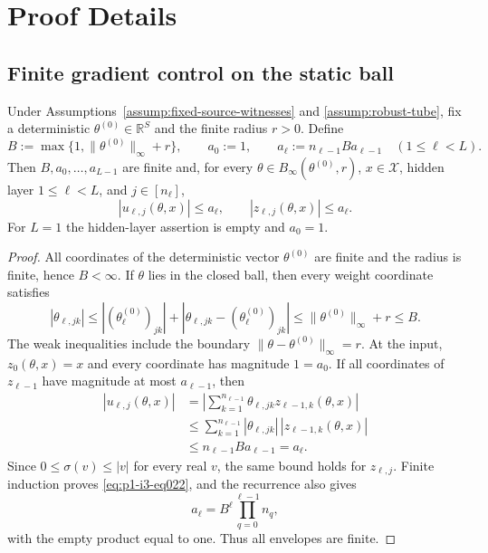 \appendix

\section{Proof Details}
\label{sec:proof-details}

\subsection{Finite gradient control on the static ball}
\label{app:step001-gradient}

\begin{lemma}
\label{lem:p1-i3-step001-forward}
Under Assumptions~\ref{assump:fixed-source-witnesses} and
\ref{assump:robust-tube}, fix a deterministic
$\theta^{(0)}\in\mathbb R^S$ and the finite radius $r>0$.  Define
\[
B:=\max\{1,\|\theta^{(0)}\|_\infty+r\},
\qquad a_0:=1,
\qquad a_\ell:=n_{\ell-1}B a_{\ell-1}
\quad(1\leq\ell<L).
\tag{21}\label{eq:p1-i3-eq021}
\]
Then $B,a_0,\ldots,a_{L-1}$ are finite and, for every
$\theta\in B_\infty(\theta^{(0)},r)$, $x\in\mathcal X$, hidden layer
$1\leq\ell<L$, and $j\in[n_\ell]$,
\[
|u_{\ell,j}(\theta,x)|\leq a_\ell,
\qquad
|z_{\ell,j}(\theta,x)|\leq a_\ell.
\tag{22}\label{eq:p1-i3-eq022}
\]
For $L=1$ the hidden-layer assertion is empty and $a_0=1$.
\end{lemma}

\begin{proof}
All coordinates of the deterministic vector $\theta^{(0)}$ are finite and
the radius is finite, hence $B<\infty$.  If $\theta$ lies in the closed ball,
then every weight coordinate satisfies
\[
|\theta_{\ell,jk}|
\leq |(\theta^{(0)}_\ell)_{jk}|
      +|\theta_{\ell,jk}-(\theta^{(0)}_\ell)_{jk}|
\leq \|\theta^{(0)}\|_\infty+r\leq B.
\tag{23}\label{eq:p1-i3-eq023}
\]
The weak inequalities include the boundary $\|\theta-\theta^{(0)}\|_\infty=r$.
At the input, $z_0(\theta,x)=x$ and every coordinate has magnitude
$1=a_0$.  If all coordinates of $z_{\ell-1}$ have magnitude at most
$a_{\ell-1}$, then
\[
\begin{aligned}
|u_{\ell,j}(\theta,x)|
&=\left|\sum_{k=1}^{n_{\ell-1}}
       \theta_{\ell,jk}z_{\ell-1,k}(\theta,x)\right|\\
&\leq\sum_{k=1}^{n_{\ell-1}}
       |\theta_{\ell,jk}|\,|z_{\ell-1,k}(\theta,x)|\\
&\leq n_{\ell-1}B a_{\ell-1}=a_\ell.
\end{aligned}
\tag{24}\label{eq:p1-i3-eq024}
\]
Since $0\leq\sigma(v)\leq|v|$ for every real $v$, the same bound holds
for $z_{\ell,j}$.  Finite induction proves \eqref{eq:p1-i3-eq022}, and the recurrence also
gives
\[
a_\ell=B^\ell\prod_{q=0}^{\ell-1}n_q,
\tag{25}\label{eq:p1-i3-eq025}
\]
with the empty product equal to one.  Thus all envelopes are finite.
\end{proof}

